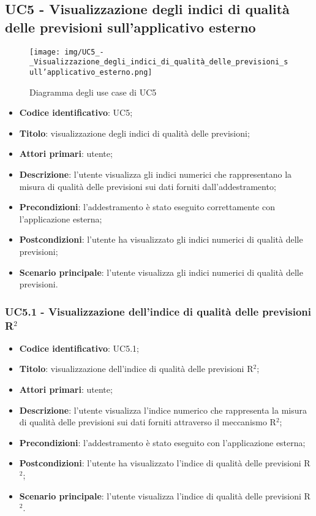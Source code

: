 \subsection{UC5 - Visualizzazione degli indici di qualità delle previsioni sull'applicativo esterno}
\begin{figure}[H]
	\texttt{[image: img/UC5\_-\_Visualizzazione\_degli\_indici\_di\_qualità\_delle\_previsioni\_sull'applicativo\_esterno.png]}
	\caption{Diagramma degli use case di UC5}
\end{figure}
\begin{itemize}
	\item \textbf{Codice identificativo}: UC5;
	\item \textbf{Titolo}: visualizzazione degli indici di qualità delle previsioni;
	\item \textbf{Attori primari}: utente;
	\item \textbf{Descrizione}: l'utente visualizza gli indici numerici che rappresentano la misura di qualità delle previsioni sui dati forniti dall'addestramento;
	\item \textbf{Precondizioni}: l'addestramento è stato eseguito correttamente con l'applicazione esterna;
	\item \textbf{Postcondizioni}: l'utente ha visualizzato gli indici numerici di qualità delle previsioni;
	\item \textbf{Scenario principale}: l'utente visualizza gli indici numerici di qualità delle previsioni.
\end{itemize} 
\subsubsection{UC5.1 - Visualizzazione dell'indice di qualità delle previsioni R$^{2}$}
\begin{itemize}
	\item \textbf{Codice identificativo}: UC5.1;
	\item \textbf{Titolo}: visualizzazione dell'indice di qualità delle previsioni R$^{2}$\glo;
	\item \textbf{Attori primari}: utente;
	\item \textbf{Descrizione}: l'utente visualizza l'indice numerico che rappresenta la misura di qualità delle previsioni sui dati forniti attraverso il meccanismo R$^{2}$\glo;
	\item \textbf{Precondizioni}: l'addestramento è stato eseguito con l'applicazione esterna;
	\item \textbf{Postcondizioni}: l'utente ha visualizzato l'indice di qualità delle previsioni R$^{2}$\glo;
	\item \textbf{Scenario principale}: l'utente visualizza l'indice di qualità delle previsioni R$^{2}$\glo.
\end{itemize} 
